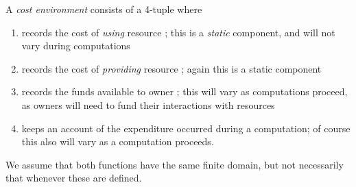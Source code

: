 \documentclass{LMCS}
\newcommand{\EndDefBox}{\null\hfill}
\newcommand{\boxHere}{\global\let\EndProof\empty\EndDefBox}
\begin{document}
\begin{defi}\label{def:costenv}
A  \emph{cost environment}  consists
of a 4-tuple   where
\begin{enumerate}[]

\item 


 records the cost of \emph{using} resource ; this is a
\emph{static} component, and will not vary during computations

\item 


 records the cost of \emph{providing} resource ; again
this is a static component

\item 


 records the funds available to owner ; this will vary as computations proceed, as owners will need to
fund their interactions with resources

\item  

  keeps an
account of the expenditure occurred during a computation; of course
this also will vary as a computation proceeds.
\end{enumerate}

\medspace We assume that both functions  have the same
finite domain, but not necessarily that 
whenever these are defined. \boxHere
\end{defi}
\end{document}
